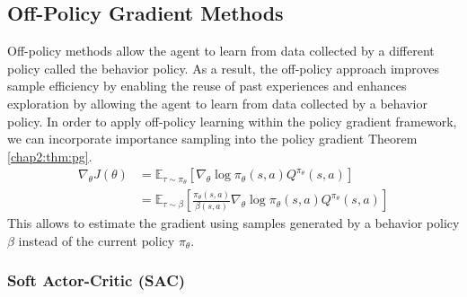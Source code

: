 \subsection{Off-Policy Gradient Methods} \label{chap2:sec3}

Off-policy methods allow the agent to learn from data collected by a different policy called the behavior policy.
As a result, the off-policy approach improves sample efficiency by enabling the reuse of past experiences and enhances exploration by allowing the agent to learn from data collected by a behavior policy.
In order to apply off-policy learning within the policy gradient framework, we can incorporate importance sampling into the policy gradient Theorem \ref{chap2:thm:pg}.
\begin{equation}
  \begin{aligned}
    \nabla_\theta J(\theta)
    &= \mathbb{E}_{\tau \sim \pi_\theta} [\nabla_\theta \log \pi_\theta(s, a) Q^{\pi_\theta}(s, a)] \\
    &= \mathbb{E}_{\tau \sim \beta} \left[ \frac{\pi_\theta(s, a)}{\beta(s, a)} \nabla_\theta \log \pi_\theta(s, a) Q^{\pi_\theta}(s, a) \right]
  \end{aligned}
\end{equation}
This allows to estimate the gradient using samples generated by a behavior policy $\beta$ instead of the current policy $\pi_\theta$.

\subsubsection{Soft Actor-Critic (SAC)} \label{chap2:sec3:sac}

